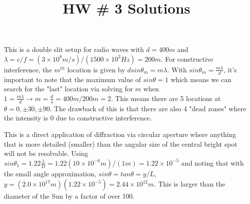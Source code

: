 \documentclass[10pt]{article}
\newenvironment{problem}[2][Problem]{\begin{trivlist}
\item[\hskip \labelsep {\bfseries #1}\hskip \labelsep {\bfseries #2.}]}{\end{trivlist}}
\begin{document}
 \title{HW \# 3 Solutions}
\date{}
\maketitle

\begin{problem}{1}
\item This is a double slit setup for radio waves with $d=400m$ and $\lambda = c/f=(3\times 10^8 m/s)/(1500\times 10^3Hz)=200m$. For constructive interference, the $m^{th}$ location is given by $dsin\theta_m=m\lambda$. With $sin\theta_m=\frac{m\lambda}{d}$, it's important to note that the maximum value of $sin\theta=1$ which means we can search for the "last" location via solving for $m$ when $1 = \frac{m\lambda}{d}\xrightarrow{} m=\frac{d}{\lambda} = 400m/200m=2$. This means there are 5 locations at $\theta=0, \pm30, \pm90$. The drawback of this is that there are also 4 "dead zones" where the intensity is 0 due to constructive interference.
\end{problem}
 
\begin{problem}{2}
This is a direct application of diffraction via circular aperture where anything that is more detailed (smaller) than the angular size of the central bright spot will not be resolvable. Using $sin\theta_1 = 1.22 \frac{\lambda}{D}=1.22 (10\times10^{-6}m)/(1m)=1.22\times10^{-5}$ and noting that with the small angle approximation, $sin\theta=tan\theta=y/L$, $y=(2.0\times10^{17}m)(1.22\times 10^{-5})=2.44\times10^{12}m$. This is larger than the diameter of the Sun by a factor of over 100.
\end{problem}
\end{document}
